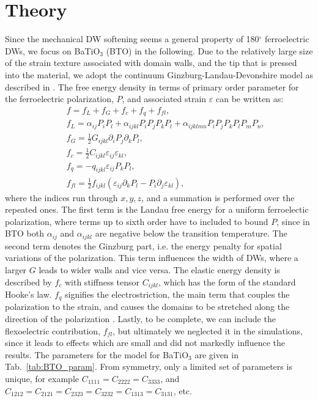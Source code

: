 
\section{Theory}
Since the mechanical DW softening seems a general property of 180$^\circ$ ferroelectric DWs, we focus on BaTiO$_3$ (BTO) in the following.
Due to the relatively large size of the strain texture associated with domain walls, and the tip that is pressed into the material, we adopt the continuum Ginzburg-Landau-Devonshire model as described in \cite{Marton2010}.  
The free energy density in terms of primary order parameter for the ferroelectric polarization, $P$, and associated strain $\varepsilon$ can be written as:
\begin{eqnarray}\label{eq:BTO_energy}
&&f = f_{L}+f_{G}+f_{c}+f_{q}+f_{fl},\\
&&f_{L} = \alpha_{ij}P_iP_l + \alpha_{ijkl}P_{i}P_{j}P_{k}P_{l} + \alpha_{ijklmn} P_i P_j P_k P_l P_m P_n,\\
&&f_{G} = \frac{1}{2}G_{ijkl}\partial_i P_j\partial_k P_l,\\
&&f_{c} = \frac{1}{2}C_{ijkl}\varepsilon_{ij}\varepsilon_{kl},\\
&&f_{q}= - q_{ijkl}\varepsilon_{ij}P_{k}P_{l},\label{eq:qpp}\\
&&f_{fl}=\frac{1}{2}f_{ijkl}(\varepsilon_{ij}\partial_k P_l - P_i\partial_j\varepsilon_{kl}),
\end{eqnarray}
where the indices run through ${x,y,z}$, and a summation is performed over the repeated ones.
The first term is the Landau free energy for a uniform ferroelectic polarization, where terms up to sixth order have to included to bound $P$, since in BTO both $\alpha_{ij}$ and $\alpha_{ijkl}$ are negative below the transition temperature.
The second term denotes the Ginzburg part, i.e. the energy penalty for spatial variations of the polarization.
This term influences the width of DWs, where a larger $G$ leads to wider walls and vice versa.
The elastic energy density is described by $f_c$ with stiffness tensor $C_{ijkl}$, which has the form of the standard Hooke's law.
$f_q$ signifies the electrostriction, the main term that couples the polarization to the strain, and causes the domains to be stretched along the direction of the polarization .
Lastly, to be complete, we can include the flexoelectric contribution, $f_{fl}$, but ultimately we neglected it in the simulations, since it leads to effects which are small and did not markedly influence the results.
The parameters for the model for BaTiO$_3$ are given in Tab.~\ref{tab:BTO_param}.
From symmetry, only a limited set of parameters is unique, for example $C_{1111} = C_{2222} = C_{3333}$, and $C_{1212} = C_{2121} = C_{2323} = C_{3232} = C_{1313} = C_{3131}$, etc. 

